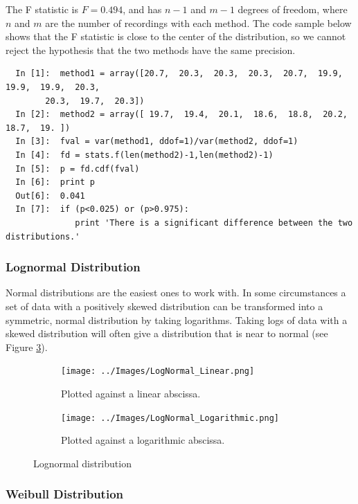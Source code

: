 The F statistic is $F = 0.494$, and has $n-1$ and $m-1$ degrees of freedom, where $n$ and $m$ are the number of recordings with each method. The code sample below shows that the F statistic is close to the center of the distribution, so we cannot reject the hypothesis that the two methods have the same precision.

\begin{lstlisting}
  In [1]:  method1 = array([20.7,  20.3,  20.3,  20.3,  20.7,  19.9,  19.9,  19.9,  20.3,
        20.3,  19.7,  20.3])
  In [2]:  method2 = array([ 19.7,  19.4,  20.1,  18.6,  18.8,  20.2,  18.7,  19. ])
  In [3]:  fval = var(method1, ddof=1)/var(method2, ddof=1)
  In [4]:  fd = stats.f(len(method2)-1,len(method2)-1)
  In [5]:  p = fd.cdf(fval)
  In [6]:  print p
  Out[6]:  0.041
  In [7]:  if (p<0.025) or (p>0.975):
              print 'There is a significant difference between the two distributions.'
\end{lstlisting}


\subsubsection{Lognormal Distribution}

Normal distributions are the easiest ones to work with. In some circumstances a set of data with a positively skewed distribution can be transformed into a symmetric, normal distribution by taking logarithms. Taking logs of data with a skewed distribution will often give a distribution that is near to normal (see Figure \ref{fig:lognormal}).

\begin{figure}
\centering
\begin{subfigure}{.5\textwidth}
  \centering
  \texttt{[image: ../Images/LogNormal\_Linear.png]}
  \caption{Plotted against a linear abscissa.}
  \label{fig:Lognormal_Sub1}
\end{subfigure}%
\begin{subfigure}{.5\textwidth}
  \centering
  \texttt{[image: ../Images/LogNormal\_Logarithmic.png]}
  \caption{Plotted against a logarithmic abscissa.}
  \label{fig:Lognormal_Sub2}
\end{subfigure}
\caption{Lognormal distribution}
\label{fig:lognormal}
\end{figure}

\subsubsection{Weibull Distribution}

